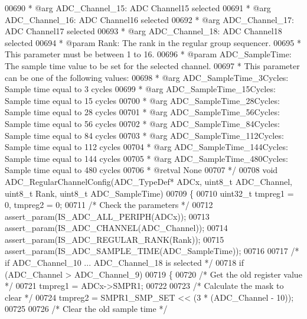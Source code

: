 \begin{DoxyCode}
00690 \textcolor{comment}{  *            @arg ADC\_Channel\_15: ADC Channel15 selected}
00691 \textcolor{comment}{  *            @arg ADC\_Channel\_16: ADC Channel16 selected}
00692 \textcolor{comment}{  *            @arg ADC\_Channel\_17: ADC Channel17 selected}
00693 \textcolor{comment}{  *            @arg ADC\_Channel\_18: ADC Channel18 selected                       }
00694 \textcolor{comment}{  * @param  Rank: The rank in the regular group sequencer.}
00695 \textcolor{comment}{  *          This parameter must be between 1 to 16.}
00696 \textcolor{comment}{  * @param  ADC\_SampleTime: The sample time value to be set for the selected channel. }
00697 \textcolor{comment}{  *          This parameter can be one of the following values:}
00698 \textcolor{comment}{  *            @arg ADC\_SampleTime\_3Cycles: Sample time equal to 3 cycles}
00699 \textcolor{comment}{  *            @arg ADC\_SampleTime\_15Cycles: Sample time equal to 15 cycles}
00700 \textcolor{comment}{  *            @arg ADC\_SampleTime\_28Cycles: Sample time equal to 28 cycles}
00701 \textcolor{comment}{  *            @arg ADC\_SampleTime\_56Cycles: Sample time equal to 56 cycles }
00702 \textcolor{comment}{  *            @arg ADC\_SampleTime\_84Cycles: Sample time equal to 84 cycles }
00703 \textcolor{comment}{  *            @arg ADC\_SampleTime\_112Cycles: Sample time equal to 112 cycles   }
00704 \textcolor{comment}{  *            @arg ADC\_SampleTime\_144Cycles: Sample time equal to 144 cycles   }
00705 \textcolor{comment}{  *            @arg ADC\_SampleTime\_480Cycles: Sample time equal to 480 cycles   }
00706 \textcolor{comment}{  * @retval None}
00707 \textcolor{comment}{  */}
00708 \textcolor{keywordtype}{void} ADC_RegularChannelConfig(ADC\_TypeDef* ADCx, uint8\_t ADC\_Channel, uint8\_t Rank, uint8\_t 
      ADC\_SampleTime)
00709 \{
00710   uint32\_t tmpreg1 = 0, tmpreg2 = 0;
00711   \textcolor{comment}{/* Check the parameters */}
00712   assert_param(IS\_ADC\_ALL\_PERIPH(ADCx));
00713   assert_param(IS\_ADC\_CHANNEL(ADC\_Channel));
00714   assert_param(IS\_ADC\_REGULAR\_RANK(Rank));
00715   assert_param(IS\_ADC\_SAMPLE\_TIME(ADC\_SampleTime));
00716 
00717   \textcolor{comment}{/* if ADC\_Channel\_10 ... ADC\_Channel\_18 is selected */}
00718   \textcolor{keywordflow}{if} (ADC\_Channel > ADC_Channel_9)
00719   \{
00720     \textcolor{comment}{/* Get the old register value */}
00721     tmpreg1 = ADCx->SMPR1;
00722 
00723     \textcolor{comment}{/* Calculate the mask to clear */}
00724     tmpreg2 = SMPR1_SMP_SET << (3 * (ADC\_Channel - 10));
00725 
00726     \textcolor{comment}{/* Clear the old sample time */}

\end{DoxyCode}
